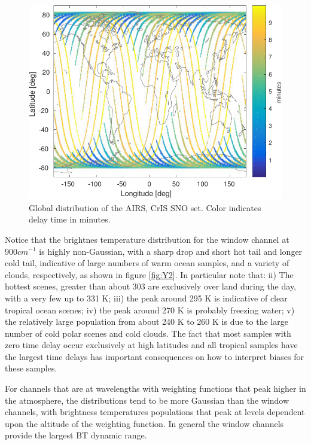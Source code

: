 \documentclass[twocolumn,10pt]{article}
\begin{document}
\begin{figure}[htb]
\centering
\includegraphics[width=\linewidth]{./figs/AC_jplSNO_delay_map.pdf}
\caption{\label{fig:orgparagraph10}
  Global distribution of the AIRS, CrIS SNO set. Color indicates delay time in minutes.}
\label{fig:Y1}
\end{figure}

Notice that the brightnes temperature distribution for the window channel at $900 cm^{-1}$ is highly non-Gaussian, with a sharp drop and short hot tail and longer cold tail, indicative of large numbers of warm ocean samples, and a variety of clouds, respectively, as shown in figure \ref{fig:Y2}. In particular note that: 
ii) The hottest scenes, greater than about 303 are exclusively over land during the day, with a very few up to 331 K; 
iii) the peak around 295 K is indicative of clear tropical ocean scenes; 
iv) the peak around 270 K is probably freezing water; 
v) the relatively large population from about 240 K to 260 K is due to the large number of cold polar scenes and cold clouds. The fact that most samples with zero time delay occur exclusively at high latitudes and all tropical samples have the largest time delays has important consequences on how to interpret biases for these samples.

For channels that are at wavelengths with weighting functions that peak higher in the atmosphere, the distributions tend to be more Gaussian than the window channels, with brightness temperatures populations that peak at levels dependent upon the altitude of the weighting function. In general the window channels provide the largest BT dynamic range.
\end{document}
